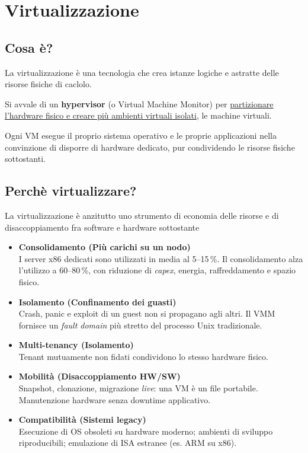 \chapter{Virtualizzazione}
\section{Cosa è?}
La virtualizzazione è una tecnologia che crea istanze logiche e astratte delle risorse fisiche di caclolo.

Si avvale di un \textbf{hypervisor} (o Virtual Machine Monitor) per \underline{partizionare l'hardware fisico e creare più ambienti virtuali isolati}, le machine virtuali.

Ogni VM esegue il proprio sistema operativo e le proprie applicazioni nella convinzione di disporre di hardware dedicato, pur condividendo le risorse fisiche sottostanti.

\section{Perchè virtualizzare?}
La virtualizzazione è anzitutto uno strumento di economia delle risorse e di disaccoppiamento fra software e hardware sottostante

\begin{itemize}
    \item \textbf{Consolidamento (Più carichi su un nodo)} \\
    I server x86 dedicati sono utilizzati in media al 5--15\,\%. Il consolidamento alza l'utilizzo a 60--80\,\%, con riduzione di \textit{capex}, energia, raffreddamento e spazio fisico.
    
    \item \textbf{Isolamento (Confinamento dei guasti)} \\
    Crash, panic e exploit di un guest non si propagano agli altri. Il VMM fornisce un \textit{fault domain} più stretto del processo Unix tradizionale.
    
    \item \textbf{Multi-tenancy (Isolamento)} \\
    Tenant mutuamente non fidati condividono lo stesso hardware fisico.
    
    \item \textbf{Mobilità (Disaccoppiamento HW/SW)} \\
    Snapshot, clonazione, migrazione \textit{live}: una VM è un file portabile. Manutenzione hardware senza downtime applicativo.
    
    \item \textbf{Compatibilità (Sistemi legacy)} \\
    Esecuzione di OS obsoleti su hardware moderno; ambienti di sviluppo riproducibili; emulazione di ISA estranee (es. ARM su x86).
\end{itemize}

